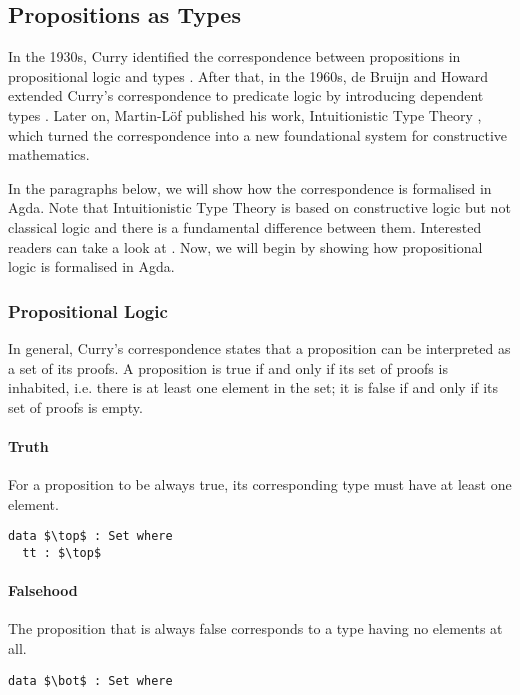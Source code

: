 \subsection{Propositions as Types}
\par In the 1930s, Curry identified the
correspondence between propositions in propositional logic and types
\cite{curry1934}. After that, in the 1960s, de Bruijn and Howard extended
Curry's correspondence to predicate logic by introducing dependent
types \cite{bruijn1968, howard1969}. Later on, Martin-L\"of published
his work, Intuitionistic Type Theory \cite{martin1984}, which turned the correspondence into a new
foundational system for constructive mathematics. 

\par In the paragraphs below, we will show how the correspondence is
formalised in Agda. Note that Intuitionistic Type
Theory is based on constructive logic but not classical logic and there
is a fundamental difference between them. Interested readers can take a look at
\cite{avigad2000}. Now, we will begin by showing how propositional
logic is formalised in Agda. 

\subsubsection{Propositional Logic} 
\par In general, Curry's correspondence
states that a proposition can be interpreted as a set of its proofs. A
proposition is true if and only if its set of proofs is inhabited,
i.e. there is at least one element in the set; it is false if and only
if its set of proofs is empty. 

\paragraph{Truth} For a proposition to be always true, its
corresponding type must have at least one element. 
\begin{lstlisting}[mathescape=true,xleftmargin=.3\textwidth]
data $\top$ : Set where
  tt : $\top$
\end{lstlisting} 

\paragraph{Falsehood} The proposition that is always
false corresponds to a type having no elements at all. 
\begin{lstlisting}[mathescape=true,xleftmargin=.3\textwidth]
data $\bot$ : Set where
\end{lstlisting} 

